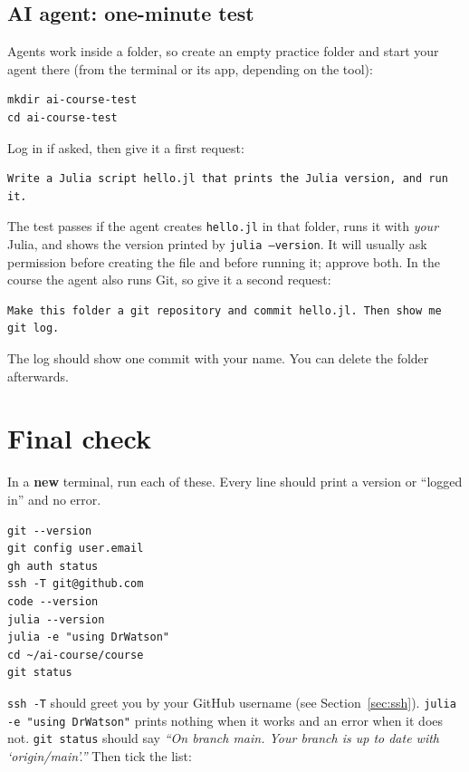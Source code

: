 \documentclass[11pt,a4paper]{article}
\newcommand{\cmd}[1]{\texttt{#1}}
\begin{document}
\subsection{AI agent: one-minute test}\label{sec:agent-test}
Agents work inside a folder, so create an empty practice folder and start your agent
there (from the terminal or its app, depending on the tool):
\begin{lstlisting}
mkdir ai-course-test
cd ai-course-test
\end{lstlisting}
Log in if asked, then give it a first request:
\begin{lstlisting}[language={}]
Write a Julia script hello.jl that prints the Julia version, and run it.
\end{lstlisting}
The test passes if the agent creates \cmd{hello.jl} in that folder, runs it with
\emph{your} Julia, and shows the version printed by \cmd{julia --version}. It will
usually ask permission before creating the file and before running it; approve both.
In the course the agent also runs Git, so give it a second request:
\begin{lstlisting}[language={}]
Make this folder a git repository and commit hello.jl. Then show me git log.
\end{lstlisting}
The log should show one commit with your name. You can delete the folder afterwards.

\section{Final check}\label{sec:verify}

In a \textbf{new} terminal, run each of these. Every line should print a version or
``logged in'' and no error.
\begin{lstlisting}
git --version
git config user.email
gh auth status
ssh -T git@github.com
code --version
julia --version
julia -e "using DrWatson"
cd ~/ai-course/course
git status
\end{lstlisting}
\cmd{ssh -T} should greet you by your GitHub username (see Section~\ref{sec:ssh}).
\cmd{julia -e "using DrWatson"} prints nothing when it works and an error when it does
not. \cmd{git status} should say \emph{``On branch main. Your branch is up to date with
`origin/main'.''}
Then tick the list:
\end{document}
